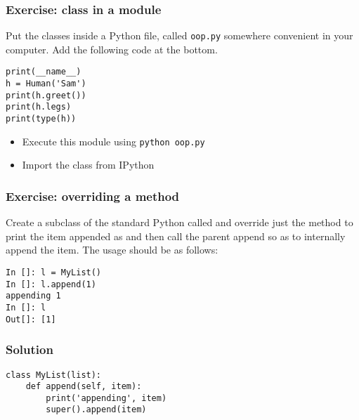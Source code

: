 \documentclass[14pt,compress,aspectratio=169]{beamer}
\begin{document}
\begin{frame}[fragile]
  \frametitle{Exercise: class in a module}

  \begin{block}{}
    Put the  classes inside a Python file, called
    \texttt{oop.py} somewhere convenient in your computer.  Add the following
    code at the bottom.
  \end{block}
\begin{lstlisting}
print(__name__)
h = Human('Sam')
print(h.greet())
print(h.legs)
print(type(h))
\end{lstlisting}

  \begin{itemize}
  \item Execute this module using \texttt{python oop.py}
  \item Import the  class from IPython
  \end{itemize}
\end{frame}

\begin{frame}
  \frametitle{Exercise: overriding a  method}
  \begin{block}{}
    Create a subclass of the standard Python  called  and
    override just the  method to print the item appended as
     and then call the parent append so as to
    internally append the item. The usage should be as follows:
  \end{block}

\begin{lstlisting}
In []: l = MyList()
In []: l.append(1)
appending 1
In []: l
Out[]: [1]
\end{lstlisting}
\end{frame}


\begin{frame}
  \frametitle{Solution}
\begin{lstlisting}
class MyList(list):
    def append(self, item):
        print('appending', item)
        super().append(item)
\end{lstlisting}
\end{frame}
\end{document}
